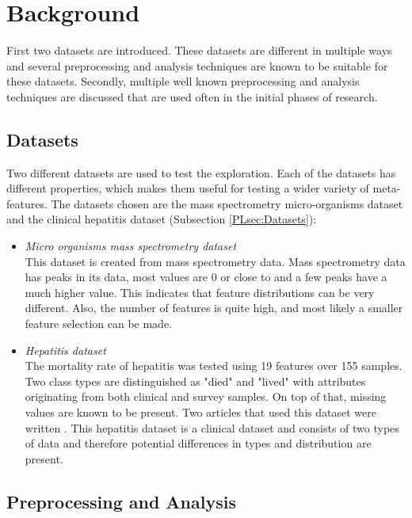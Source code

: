 \documentclass[10pt,a4paper]{report}
\begin{document}
	\section{Background}
	\label{DEsec:Background}
	
	First two datasets are introduced. These datasets are different in multiple ways and several preprocessing and analysis techniques are known to be suitable for these datasets. Secondly, multiple well known preprocessing and analysis techniques are discussed that are used often in the initial phases of research.
	
	\subsection{Datasets}
	\label{DEsubsec:Datasets}
	
	Two different datasets are used to test the exploration. Each of the datasets has different properties, which makes them useful for testing a wider variety of meta-features. The datasets chosen are the mass spectrometry micro-organisms dataset and the clinical hepatitis dataset (Subsection \ref{PLsec:Datasets}):
	
	\begin{itemize}
		\item %
		\textit{Micro organisms mass spectrometry dataset} \\ 
		This dataset is created from mass spectrometry data. Mass spectrometry data has peaks in its data, most values are 0 or close to and a few peaks have a much higher value. This indicates that feature distributions can be very different. Also, the number of features is quite high, and most likely a smaller feature selection can be made.
		\item \textit{Hepatitis dataset} \\ The mortality rate of hepatitis was tested using 19 features over 155 samples. Two class types are distinguished as "died" and "lived" with attributes originating from both clinical and survey samples. On top of that, missing values are known to be present. Two articles that used this dataset were written \cite{diaconis1983computer, cestnikkononenkoj}.
		This hepatitis dataset is a clinical dataset and consists of two types of data and therefore potential differences in types and distribution are present. 
	\end{itemize}
	
	\subsection{Preprocessing and Analysis}
	\label{DEsubsec:Preprocessing}
	
\end{document}
